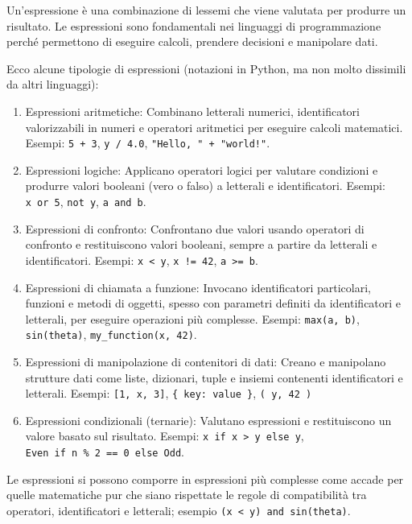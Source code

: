 \documentclass[
  letterpaper,
]{scrbook}
\begin{document}
Un'espressione è una combinazione di lessemi che viene valutata per
produrre un risultato. Le espressioni sono fondamentali nei linguaggi di
programmazione perché permettono di eseguire calcoli, prendere decisioni
e manipolare dati.

Ecco alcune tipologie di espressioni (notazioni in Python, ma non molto
dissimili da altri linguaggi):

\begin{enumerate}
\def\labelenumi{\arabic{enumi}.}
\item
  Espressioni aritmetiche: Combinano letterali numerici, identificatori
  valorizzabili in numeri e operatori aritmetici per eseguire calcoli
  matematici. Esempi: \texttt{5\ +\ 3}, \texttt{y\ /\ 4.0},
  \texttt{"Hello,\ "\ +\ "world!"}.
\item
  Espressioni logiche: Applicano operatori logici per valutare
  condizioni e produrre valori booleani (vero o falso) a letterali e
  identificatori. Esempi: \texttt{x\ or\ 5}, \texttt{not\ y},
  \texttt{a\ and\ b}.
\item
  Espressioni di confronto: Confrontano due valori usando operatori di
  confronto e restituiscono valori booleani, sempre a partire da
  letterali e identificatori. Esempi: \texttt{x\ \textless{}\ y},
  \texttt{x\ !=\ 42}, \texttt{a\ \textgreater{}=\ b}.
\item
  Espressioni di chiamata a funzione: Invocano identificatori
  particolari, funzioni e metodi di oggetti, spesso con parametri
  definiti da identificatori e letterali, per eseguire operazioni più
  complesse. Esempi: \texttt{max(a,\ b)}, \texttt{sin(theta)},
  \texttt{my\_function(x,\ 42)}.
\item
  Espressioni di manipolazione di contenitori di dati: Creano e
  manipolano strutture dati come liste, dizionari, tuple e insiemi
  contenenti identificatori e letterali. Esempi:
  \texttt{{[}1,\ x,\ 3{]}},
  \texttt{\{\ \textquotesingle{}key\textquotesingle{}:\ \textquotesingle{}value\textquotesingle{}\ \}},
  \texttt{(\ \textquotesingle{}y\textquotesingle{},\ 42\ )}
\item
  Espressioni condizionali (ternarie): Valutano espressioni e
  restituiscono un valore basato sul risultato. Esempi:
  \texttt{x\ if\ x\ \textgreater{}\ y\ else\ y},
  \texttt{\textquotesingle{}Even\textquotesingle{}\ if\ n\ \%\ 2\ ==\ 0\ else\ \textquotesingle{}Odd\textquotesingle{}}.
\end{enumerate}

Le espressioni si possono comporre in espressioni più complesse come
accade per quelle matematiche pur che siano rispettate le regole di
compatibilità tra operatori, identificatori e letterali; esempio
\texttt{(x\ \textless{}\ y)\ and\ sin(theta)}.
\end{document}
